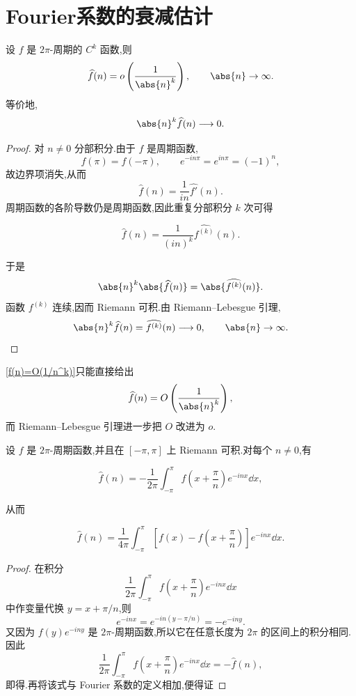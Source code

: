 \section{Fourier系数的衰减估计}

\begin{proposition}

设 $f$ 是 $2\pi$-周期的 $C^k$ 函数,则
\[
\widehat f(n)=o\left(\frac1{\abs{n}^k}\right),
\qquad \abs{n}\to\infty.
\]
等价地,
\[
\abs{n}^k\widehat f(n)\longrightarrow0.
\]
\end{proposition}

\begin{proof}
对 $n\neq0$ 分部积分.由于 $f$ 是周期函数,
\[
f(\pi)=f(-\pi),
\qquad
 e^{-in\pi}=e^{in\pi}=(-1)^n,
\]
故边界项消失,从而
\[
\widehat f(n)
=\frac1{in}\widehat{f'}(n).
\]
周期函数的各阶导数仍是周期函数,因此重复分部积分 $k$ 次可得

\[ \widehat f(n)=\frac1{(in)^k}\widehat{f^{(k)}}(n). \]

于是
\[
\abs{n}^k\abs{\widehat f(n)}
=\abs{\widehat{f^{(k)}}(n)}.
\]
函数 $f^{(k)}$ 连续,因而 Riemann 可积.由 Riemann--Lebesgue 引理,
\[
\abs{n}^k\widehat f(n)=\widehat{f^{(k)}}(n)\longrightarrow0,
\qquad \abs{n}\to\infty.
\]

\end{proof}

\ref{f(n)=O(1/n^k)}只能直接给出
\[
\widehat f(n)=O\left(\frac1{\abs{n}^k}\right),
\]
而 Riemann--Lebesgue 引理进一步把 $O$ 改进为 $o$.

\begin{lemma}

设 $f$ 是 $2\pi$-周期函数,并且在 $[-\pi,\pi]$ 上 Riemann 可积.对每个 $n\neq0$,有

\[ \widehat f(n)
=-\frac1{2\pi}\int_{-\pi}^{\pi}
 f\left(x+\frac{\pi}{n}\right)e^{-inx}\dd x, \]

从而

\[ \widehat f(n)
=\frac1{4\pi}\int_{-\pi}^{\pi}
\left[f(x)-f\left(x+\frac{\pi}{n}\right)\right]
 e^{-inx}\dd x. \]

\end{lemma}

\begin{proof}
在积分
\[
\frac1{2\pi}\int_{-\pi}^{\pi}
 f\left(x+\frac{\pi}{n}\right)e^{-inx}\dd x
\]
中作变量代换 $y=x+\pi/n$,则
\[
e^{-inx}=e^{-in(y-\pi/n)}=-e^{-iny}.
\]
又因为 $f(y)e^{-iny}$ 是 $2\pi$-周期函数,所以它在任意长度为 $2\pi$ 的区间上的积分相同.因此
\[
\frac1{2\pi}\int_{-\pi}^{\pi}
 f\left(x+\frac{\pi}{n}\right)e^{-inx}\dd x
=-\widehat f(n),
\]
即得.再将该式与 Fourier 系数的定义相加,便得证
\end{proof}

